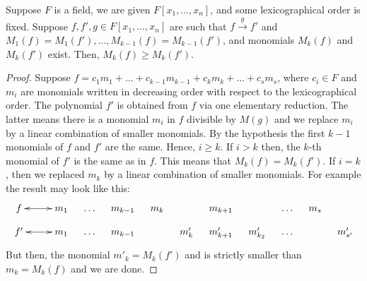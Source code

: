 \begin{claim}
\label{claim::MkReduct}
Suppose $F$ is a field, we are given $F[x_1,\ldots,x_n]$, and some lexicographical order is fixed.
Suppose $f, f',g\in F[x_1,\ldots,x_n]$ are such that $f\stackrel{g}{\longrightarrow}f'$ and $M_1(f) = M_1(f'), \ldots, M_{k-1}(f) = M_{k-1}(f')$, and monomials $M_k(f)$ and $M_k(f')$ exist.
Then, $M_k(f) \geqslant M_k(f')$.
\end{claim}
\begin{proof}
Suppose $f = c_1 m_1 + \ldots + c_{k-1} m_{k-1} + c_km_k +\ldots + c_s m_s$, where $c_i\in F$ and $m_i$ are monomials written in decreasing order with respect to the lexicographical order.
The polynomial $f'$ is obtained from $f$ via one elementary reduction.
The latter means there is a monomial $m_i$ in $f$ divisible by $M(g)$ and we replace $m_i$ by a linear combination of smaller monomials.
By the hypothesis the first $k-1$ monomials of $f$ and $f'$ are the same.
Hence, $i\geqslant k$.
If $i>k$ then, the $k$-th monomial of $f'$ is the same as in $f$.
This means that $M_k(f) = M_k(f')$.
If $i = k$, then we replaced $m_k$ by a linear combination of smaller monomials.
For example the result may look like this:
\[
\xymatrix@R=8pt@C=10pt{
	{f}\ar@{<->}[rr]&{}&{m_1}&{\ldots}&{m_{k-1}}&{m_k}&{}&{m_{k+1}}&{}&{\ldots}&{m_s}&{}\\
	{f'}\ar@{<->}[rr]&{}&{m_1}&{\ldots}&{m_{k-1}}&{}&{m'_k}&{m'_{k+1}}&{m'_{k_2}}&{\ldots}&{}&{m'_{s'}}\\
}
\]
But then, the monomial $m'_k = M_k(f')$ and is strictly smaller than $m_k = M_k(f)$ and we are done.
\end{proof}

